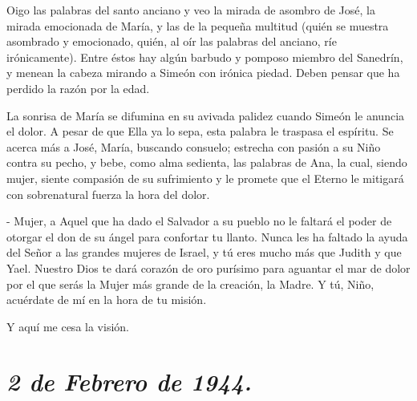 \documentclass[12pt, twoside, openright]{book} %
\begin{document}
Oigo las palabras del santo anciano y veo la mirada de asombro de José, la mirada emocionada de María, y las de la pequeña multitud (quién se muestra asombrado y emocionado, quién, al oír las palabras del anciano, ríe irónicamente). Entre éstos hay algún barbudo y pomposo miembro del Sanedrín, y menean la cabeza mirando a Simeón con irónica piedad. Deben pensar que ha perdido la razón por la edad. 

La sonrisa de María se difumina en su avivada palidez cuando Simeón le anuncia el dolor. A pesar de que Ella ya lo sepa, esta palabra le traspasa el espíritu. Se acerca más a José, María, buscando consuelo; estrecha con pasión a su Niño contra su pecho, y bebe, como alma sedienta, las palabras de Ana, la cual, siendo mujer, siente compasión de su sufrimiento y le promete que el Eterno le mitigará con sobrenatural fuerza la hora del dolor. 

- Mujer, a Aquel que ha dado el Salvador a su pueblo no le faltará el poder de otorgar el don de su ángel para confortar tu llanto. Nunca les ha faltado la ayuda del Señor a las grandes mujeres de Israel, y tú eres mucho más que Judith y que Yael. Nuestro Dios te dará corazón de oro purísimo para aguantar el mar de dolor por el que serás la Mujer más grande de la creación, la Madre. Y tú, Niño, acuérdate de mí en la hora de tu misión. 

Y aquí me cesa la visión. 

\section*{\normalfont\normalsize\textit{2 de Febrero de 1944.}}
 
\end{document}
